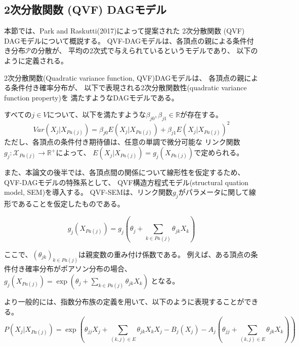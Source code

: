 
\subsection{2次分散関数 (QVF) DAGモデル}

本節では、Park and Raskutti(2017)\cite{Park2017-hw}によって提案された
2次分散関数 (QVF) DAGモデルについて概説する。
QVF-DAGモデルは、各頂点の親による条件付き分布$\mathcal P$の分散が、
平均の2次式で与えられているというモデルであり、
以下のように定義される。

\begin{df}
2次分散関数(Quadratic variance function, QVF)DAGモデルは、
各頂点の親による条件付き確率分布が、
以下で表現される2次分散関数性(quadratic variance function property)を
満たすようなDAGモデルである。

すべての$j \in V$について、以下を満たすような$\beta_{j0}, \beta_{j1} \in \mathbb R$が存在する。
  \begin{equation}
      \mathit{Var}(X_j|X_{Pa(j)}) = \beta_{j0} E(X_j | X_{Pa(j)}) + \beta_{j1} E(X_j | X_{Pa(j)})^2
      \label{QVF}
  \end{equation}
ただし、各頂点の条件付き期待値は、任意の単調で微分可能な
リンク関数$g_j \colon \mathcal X_{Pa(j)} \rightarrow \mathbb R^+$によって、
$E(X_j|X_{Pa(j)}) = g_j(X_{Pa(j)})$で定められる。
\end{df}

また、本論文の後半では、各頂点間の関係について線形性を仮定するため、
QVF-DAGモデルの特殊系として、
QVF構造方程式モデル(structural quation model, SEM)を導入する。
QVF-SEMは、リンク関数$g_j$がパラメータに関して線形であることを仮定したものである。

\begin{equation}
  g_j(X_{Pa(j)}) = g_j \left(\theta_j + \sum_{k \in Pa(j)} \theta_{jk}X_k \right)
\end{equation}

ここで、$(\theta_{jk})_{k \in Pa(j)}$は親変数の重み付け係数である。
例えば、ある頂点の条件付き確率分布がポアソン分布の場合、
$g_j(X_{Pa(j)}) = \exp(\theta_j + \sum_{k \in Pa(j)} \theta_{jk}X_k)$
となる。

より一般的には、指数分布族の定義を用いて、以下のように表現することができる。
\begin{equation}
  P(X_j|X_{Pa(j)}) = \exp \left( \theta_{jj}X_j  + \sum_{(k,j)\in E} \theta_{jk}X_k X_j -
  B_j(X_j) - A_j \left( \theta_{jj} + \sum_{(k,j) \in E} \theta_{jk} X_k \right) \right)
\end{equation}

